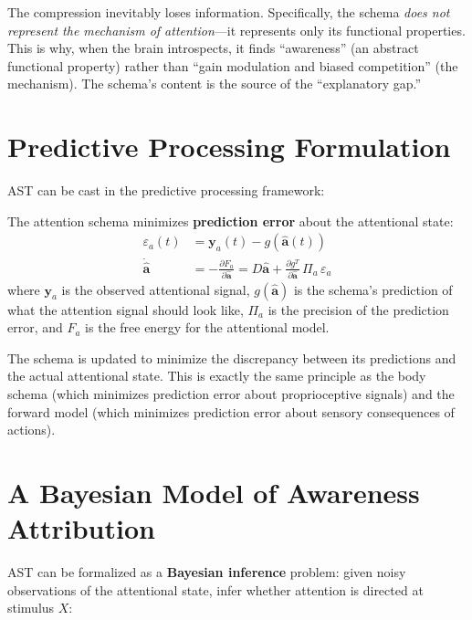 \documentclass[11pt,a4paper]{report}
\begin{document}
The compression inevitably loses information. Specifically, the schema \emph{does not represent the mechanism of attention}---it represents only its functional properties. This is why, when the brain introspects, it finds ``awareness'' (an abstract functional property) rather than ``gain modulation and biased competition'' (the mechanism). The schema's content is the source of the ``explanatory gap.''

\section{Predictive Processing Formulation}

AST can be cast in the predictive processing framework:

\begin{mathbox}
\vspace{-6pt}
The attention schema minimizes \textbf{prediction error} about the attentional state:
\begin{align}
  \varepsilon_a(t) &= \mathbf{y}_a(t) - g(\hat{\mathbf{a}}(t)) \label{eq:pred_err}\\
  \dot{\hat{\mathbf{a}}} &= -\frac{\partial F_a}{\partial \hat{\mathbf{a}}} = D\hat{\mathbf{a}} + \frac{\partial g^T}{\partial \hat{\mathbf{a}}}\, \Pi_a\, \varepsilon_a \label{eq:schema_pp}
\end{align}
where $\mathbf{y}_a$ is the observed attentional signal, $g(\hat{\mathbf{a}})$ is the schema's prediction of what the attention signal should look like, $\Pi_a$ is the precision of the prediction error, and $F_a$ is the free energy for the attentional model.
\vspace{-4pt}
\end{mathbox}

The schema is updated to minimize the discrepancy between its predictions and the actual attentional state. This is exactly the same principle as the body schema (which minimizes prediction error about proprioceptive signals) and the forward model (which minimizes prediction error about sensory consequences of actions).

\section{A Bayesian Model of Awareness Attribution}

AST can be formalized as a \textbf{Bayesian inference} problem: given noisy observations of the attentional state, infer whether attention is directed at stimulus $X$:
\end{document}
